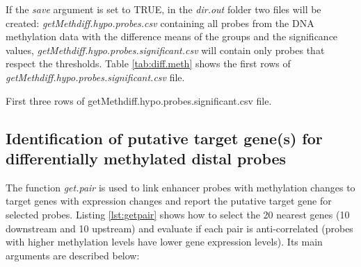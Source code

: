 If the \textit{save} argument is set to TRUE, in the \textit{dir.out} folder two files will be created: \textit{getMethdiff.hypo.probes.csv} containing all probes from the DNA methylation data with the difference means of the groups and the significance values, \textit{getMethdiff.hypo.probes.significant.csv} will contain only probes that respect the thresholds. Table \ref{tab:diff.meth} shows the first rows of  \textit{getMethdiff.hypo.probes.significant.csv} file.

\begin{table}[h!]
\caption {First three rows of  getMethdiff.hypo.probes.significant.csv file. }
\label{tab:diff.meth}
\end{table}

\newpage
\subsection*{Identification of putative target gene(s) for differentially methylated distal probes}
The function \textit{get.pair} is used to link enhancer probes with methylation changes to target genes with expression changes and report the putative target gene for selected probes. Listing \ref{lst:getpair} shows how to select the 20 nearest genes (10 downstream and 10 upstream) and evaluate if each pair is anti-correlated (probes with higher methylation levels have lower gene expression levels).
Its main arguments are described below:

